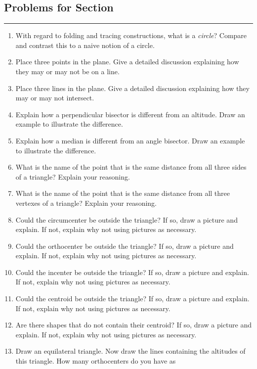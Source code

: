 \newpage



\subsection*{Problems for Section~\thesection}\hrule\vspace{1ex}
\begin{enumerate}
\item With regard to folding and tracing constructions, what is a \textit{circle}?
  Compare and contrast this to a naive notion of a circle.
\item Place three points in the plane. Give a detailed discussion
  explaining how they may or may not be on a line.
\item Place three lines in the plane. Give a detailed discussion explaining
  how they may or may not intersect.
\item Explain how a perpendicular bisector is different from an
  altitude. Draw an example to illustrate the difference.
\item Explain how a median is different from an angle bisector.  Draw an
  example to illustrate the difference.
\item What is the name of the point that is the same distance from all
  three sides of a triangle? Explain your reasoning.
\item What is the name of the point that is the same distance from all
  three vertexes of a triangle? Explain your reasoning.
\item Could the circumcenter be outside the triangle? If so, draw a
  picture and explain. If not, explain why not using pictures as
  necessary.
\item Could the orthocenter be outside the triangle? If so, draw a
  picture and explain. If not, explain why not using pictures as
  necessary.
\item Could the incenter be outside the triangle? If so, draw a
  picture and explain. If not, explain why not using pictures as
  necessary.
\item Could the centroid be outside the triangle? If so, draw a
  picture and explain. If not, explain why not using pictures as
  necessary.
\item Are there shapes that do not contain their centroid? If so, draw
  a picture and explain. If not, explain why not using pictures as
  necessary.
\item Draw an equilateral triangle. Now draw the lines containing the
  altitudes of this triangle. How many orthocenters do you have as

\end{enumerate}

